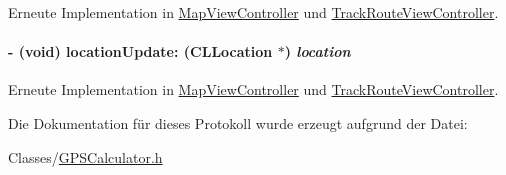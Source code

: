Erneute Implementation in \hyperlink{interface_map_view_controller_a76ee053461c5c2b8e7f1eb1a28e8d65b}{MapViewController} und \hyperlink{interface_track_route_view_controller_a451898caf9041899f09f3c7afa57dc8b}{TrackRouteViewController}.\hypertarget{protocol_g_p_s_calculator_delegate-p_a0adb149b836a8e03a11ea255a5f01a31}{
\paragraph[{locationUpdate:}]{\setlength{\rightskip}{0pt plus 5cm}-\/ (void) locationUpdate: (CLLocation $\ast$) {\em location}}\hfill}
\label{protocol_g_p_s_calculator_delegate-p_a0adb149b836a8e03a11ea255a5f01a31}


Erneute Implementation in \hyperlink{interface_map_view_controller_ad3cf36d9e97a1a448f3cedb9a6d74d52}{MapViewController} und \hyperlink{interface_track_route_view_controller_a5e00299e28aae82b6687fc1321ed1873}{TrackRouteViewController}.

Die Dokumentation für dieses Protokoll wurde erzeugt aufgrund der Datei:\begin{DoxyCompactItemize}
\item 
Classes/\hyperlink{_g_p_s_calculator_8h}{GPSCalculator.h}\end{DoxyCompactItemize}
